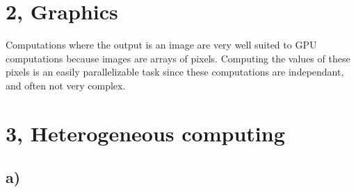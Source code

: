 \documentclass[paper=a4, fontsize=11pt]{scrartcl} %
\numberwithin{equation}{section} %
\numberwithin{figure}{section} %
\numberwithin{table}{section} %
\begin{document}
\section{2, Graphics}

Computations where the output is an image are very well suited to GPU computations because images are arrays of pixels. Computing the values of these pixels is an easily parallelizable task since these computations are independant, and often not very complex. 

\section{3, Heterogeneous computing}

\subsection{a)}
\end{document}
